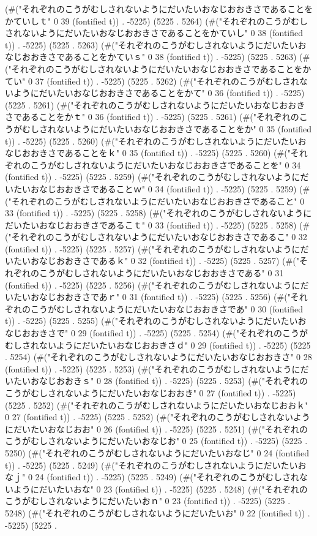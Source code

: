 (#("それぞれのこうがむしされないようにだいたいおなじおおきさであることをかていしｔ" 0 39 (fontified t)) . -5225) (5225 . 5264) (#("それぞれのこうがむしされないようにだいたいおなじおおきさであることをかていし" 0 38 (fontified t)) . -5225) (5225 . 5263) (#("それぞれのこうがむしされないようにだいたいおなじおおきさであることをかていｓ" 0 38 (fontified t)) . -5225) (5225 . 5263) (#("それぞれのこうがむしされないようにだいたいおなじおおきさであることをかてい" 0 37 (fontified t)) . -5225) (5225 . 5262) (#("それぞれのこうがむしされないようにだいたいおなじおおきさであることをかて" 0 36 (fontified t)) . -5225) (5225 . 5261) (#("それぞれのこうがむしされないようにだいたいおなじおおきさであることをかｔ" 0 36 (fontified t)) . -5225) (5225 . 5261) (#("それぞれのこうがむしされないようにだいたいおなじおおきさであることをか" 0 35 (fontified t)) . -5225) (5225 . 5260) (#("それぞれのこうがむしされないようにだいたいおなじおおきさであることをｋ" 0 35 (fontified t)) . -5225) (5225 . 5260) (#("それぞれのこうがむしされないようにだいたいおなじおおきさであることを" 0 34 (fontified t)) . -5225) (5225 . 5259) (#("それぞれのこうがむしされないようにだいたいおなじおおきさであることｗ" 0 34 (fontified t)) . -5225) (5225 . 5259) (#("それぞれのこうがむしされないようにだいたいおなじおおきさであること" 0 33 (fontified t)) . -5225) (5225 . 5258) (#("それぞれのこうがむしされないようにだいたいおなじおおきさであるこｔ" 0 33 (fontified t)) . -5225) (5225 . 5258) (#("それぞれのこうがむしされないようにだいたいおなじおおきさであるこ" 0 32 (fontified t)) . -5225) (5225 . 5257) (#("それぞれのこうがむしされないようにだいたいおなじおおきさであるｋ" 0 32 (fontified t)) . -5225) (5225 . 5257) (#("それぞれのこうがむしされないようにだいたいおなじおおきさである" 0 31 (fontified t)) . -5225) (5225 . 5256) (#("それぞれのこうがむしされないようにだいたいおなじおおきさであｒ" 0 31 (fontified t)) . -5225) (5225 . 5256) (#("それぞれのこうがむしされないようにだいたいおなじおおきさであ" 0 30 (fontified t)) . -5225) (5225 . 5255) (#("それぞれのこうがむしされないようにだいたいおなじおおきさで" 0 29 (fontified t)) . -5225) (5225 . 5254) (#("それぞれのこうがむしされないようにだいたいおなじおおきさｄ" 0 29 (fontified t)) . -5225) (5225 . 5254) (#("それぞれのこうがむしされないようにだいたいおなじおおきさ" 0 28 (fontified t)) . -5225) (5225 . 5253) (#("それぞれのこうがむしされないようにだいたいおなじおおきｓ" 0 28 (fontified t)) . -5225) (5225 . 5253) (#("それぞれのこうがむしされないようにだいたいおなじおおき" 0 27 (fontified t)) . -5225) (5225 . 5252) (#("それぞれのこうがむしされないようにだいたいおなじおおｋ" 0 27 (fontified t)) . -5225) (5225 . 5252) (#("それぞれのこうがむしされないようにだいたいおなじおお" 0 26 (fontified t)) . -5225) (5225 . 5251) (#("それぞれのこうがむしされないようにだいたいおなじお" 0 25 (fontified t)) . -5225) (5225 . 5250) (#("それぞれのこうがむしされないようにだいたいおなじ" 0 24 (fontified t)) . -5225) (5225 . 5249) (#("それぞれのこうがむしされないようにだいたいおなｊ" 0 24 (fontified t)) . -5225) (5225 . 5249) (#("それぞれのこうがむしされないようにだいたいおな" 0 23 (fontified t)) . -5225) (5225 . 5248) (#("それぞれのこうがむしされないようにだいたいおｎ" 0 23 (fontified t)) . -5225) (5225 . 5248) (#("それぞれのこうがむしされないようにだいたいお" 0 22 (fontified t)) . -5225) (5225 . 
